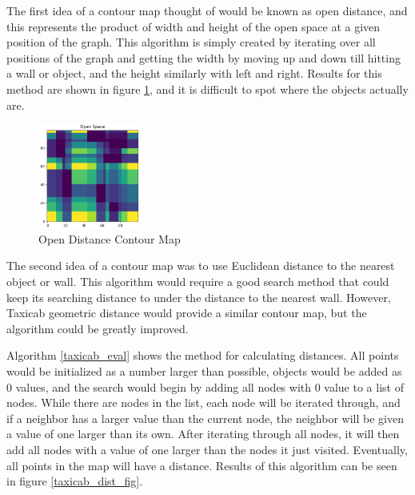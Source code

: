 \documentclass[conference]{IEEEtran}
\begin{document}
    The first idea of a contour map thought of would be known as open distance, and this represents the product of width and height of the open space at a given position of the graph. This algorithm is simply created by iterating over all positions of the graph and getting the width by moving up and down till hitting a wall or object, and the height similarly with left and right. Results for this method are shown in figure \ref{open_dist_fig}, and it is difficult to spot where the objects actually are. 
    \begin{figure}
        \centering
        \includegraphics[width=0.3\textwidth]{contour_map_opendist.png}
        \caption{Open Distance Contour Map}
        \label{open_dist_fig}
    \end{figure}

    The second idea of a contour map was to use Euclidean distance to the nearest object or wall. This algorithm would require a good search method that could keep its searching distance to under the distance to the nearest wall. However, Taxicab geometric distance would provide a similar contour map, but the algorithm could be greatly improved. 

    Algorithm \ref{taxicab_eval} shows the method for calculating distances. All points would be initialized as a number larger than possible, objects would be added as 0 values, and the search would begin by adding all nodes with 0 value to a list of nodes. While there are nodes in the list, each node will be iterated through, and if a neighbor has a larger value than the current node, the neighbor will be given a value of one larger than its own. After iterating through all nodes, it will then add all nodes with a value of one larger than the nodes it just visited. Eventually, all points in the map will have a distance. Results of this algorithm can be seen in figure \ref{taxicab_dist_fig}.
\end{document}
